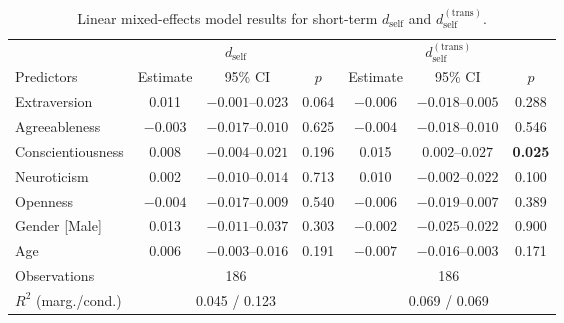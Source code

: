 \begin{table}[htbp]
\centering
\caption{Linear mixed-effects model results for short-term $d_{\text{self}}$ and $d_{\text{self}}^{(\text{trans})}$. }
\label{tab:lmer_short_signature_min}
\begin{tabular}{lcccccc}
\toprule
& \multicolumn{3}{c}{$d_{\text{self}}$} & \multicolumn{3}{c}{$d_{\text{self}}^{(\text{trans})}$} \\
\cmidrule(lr){2-4}\cmidrule(lr){5-7}
Predictors & Estimate & 95\% CI & $p$ & Estimate & 95\% CI & $p$ \\
\midrule
Extraversion           & 0.011   & $-0.001$--$0.023$ & 0.064 & $-0.006$ & $-0.018$--$0.005$ & 0.288 \\
Agreeableness          & $-0.003$& $-0.017$--$0.010$ & 0.625 & $-0.004$ & $-0.018$--$0.010$ & 0.546 \\
Conscientiousness      & 0.008   & $-0.004$--$0.021$ & 0.196 & 0.015    & $0.002$--$0.027$  & \textbf{0.025} \\
Neuroticism            & 0.002   & $-0.010$--$0.014$ & 0.713 & 0.010    & $-0.002$--$0.022$ & 0.100 \\
Openness               & $-0.004$& $-0.017$--$0.009$ & 0.540 & $-0.006$ & $-0.019$--$0.007$ & 0.389 \\
Gender [Male]          & 0.013   & $-0.011$--$0.037$ & 0.303 & $-0.002$ & $-0.025$--$0.022$ & 0.900 \\
Age                    & 0.006   & $-0.003$--$0.016$ & 0.191 & $-0.007$ & $-0.016$--$0.003$ & 0.171 \\
\midrule
Observations           & \multicolumn{3}{c}{186} & \multicolumn{3}{c}{186} \\
$R^2$ (marg./cond.)    & \multicolumn{3}{c}{0.045 / 0.123} & \multicolumn{3}{c}{0.069 / 0.069} \\
\bottomrule
\end{tabular}
\end{table}
